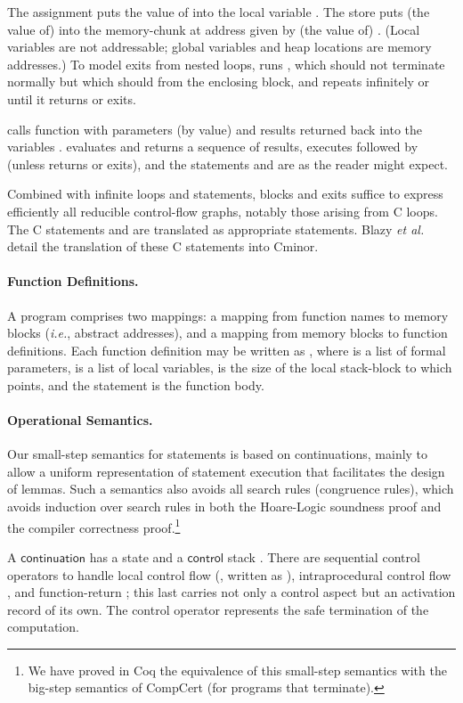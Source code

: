 \documentclass{llncs}
\newcommand{\cminor}{Cminor}
\newcommand{\compcert}{CompCert}
\newcommand{\tyface}[1]{\ensuremath{\mathsf{#1}}}
\begin{document}
The assignment  puts the value of  into the local variable .
The store  puts (the value of)  into the
memory-chunk  at address given by (the value of) .
(Local variables are not addressable; global variables and heap locations
are memory addresses.)
To model exits from nested loops,
 runs , which should not terminate normally but
which should  from the  enclosing block, and
 repeats  infinitely or until it returns or exits.
 
calls function  with parameters (by value) 
and results returned back into the variables .
 evaluates and returns a sequence of results,
 executes  followed by  (unless 
 returns or exits), and the statements
 and  are as the reader might expect.

Combined with infinite loops and  statements, blocks and exits
suffice to express efficiently all reducible control-flow graphs, notably those arising from
C loops.
The C statements  and  are translated as
appropriate  statements. Blazy \emph{et al.} \cite{blazy06:fm} detail the translation of these C statements
into \cminor.

\paragraph{Function Definitions.}
A program  comprises two mappings:
a mapping from function names to memory blocks (\textit{i.e.}, abstract
addresses),
and a mapping from memory blocks to function definitions.
Each function definition may be written as
, where 
 is a list of formal parameters,
 is a list of local variables,
 is the size of the local stack-block to which
 points, and the statement  is the 
function body.  

\paragraph{Operational Semantics.}
Our small-step semantics for statements is based on continuations, 
mainly to allow a uniform representation of statement execution
that facilitates the design of lemmas.
Such a semantics also avoids all search rules (congruence rules),
which avoids induction over search rules in both
the Hoare-Logic soundness proof and the compiler correctness proof.\footnote{
We have proved in Coq the
equivalence of this small-step semantics with the 
big-step semantics of \compcert{} 
(for programs that terminate).} 

\begin{definition}
A \tyface{continuation}  has
a state 
and a \tyface{control} stack . There are 
sequential control operators
to handle local control flow (, written as
 ), 
intraprocedural control flow ,
and function-return ; this last carries not only
a control aspect but an activation record of its own.
The control operator  represents the safe
termination of the computation.
\vspace{-8pt}

\end{definition}
\end{document}
